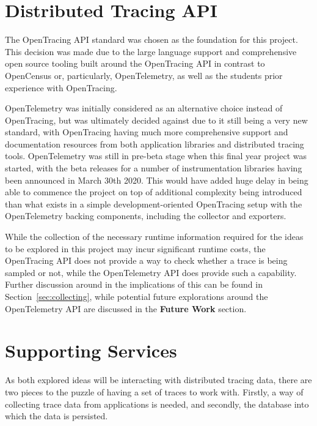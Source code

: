 \documentclass[12pt,pdftex,titlepage]{report}
\begin{document}
        \section{Distributed Tracing API}
            The OpenTracing API standard was chosen as the foundation for this project. This decision was made due to the large language support and comprehensive open
            source tooling built around the OpenTracing API in contrast to OpenCensus or, particularly, OpenTelemetry, as well as the students prior experience with OpenTracing.

            OpenTelemetry was initially considered as an alternative choice instead of OpenTracing, but was ultimately decided against due to it still being a very new
            standard, with OpenTracing having much more comprehensive support and documentation resources from both application libraries and distributed tracing tools.
            OpenTelemetry was still in pre-beta stage when this final year project was started, with the beta releases for a number of instrumentation libraries having been
            announced in March 30th 2020. This would have added huge delay in being able to commence the project on top of additional complexity being introduced than what exists 
            in a simple development-oriented OpenTracing setup with the OpenTelemetry backing components, including the collector and exporters.

            While the collection of the necessary runtime information required for the ideas to be explored in this project may incur significant runtime costs, the OpenTracing API 
            does not provide a way to check whether a trace is being sampled or not, while the OpenTelemetry API does provide such a capability{\cite{openteleisrecording}}. Further discussion 
            around in the implications of this can be found in Section~{\ref{sec:collecting}}, while potential future explorations around the OpenTelemetry API are discussed in the
            \textbf{Future Work} section.

        \section{Supporting Services}
            As both explored ideas will be interacting with distributed tracing data, there are two pieces to the puzzle of having a set of traces to work with.
            Firstly, a way of collecting trace data from applications is needed, and secondly, the database into which the data is persisted.
            
\end{document}
